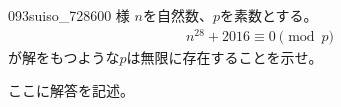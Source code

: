 \begin{prob}{093}{}{suiso\_728600 様}
 $n$を自然数、$p$を素数とする。
 \begin{align*}
  n^{28}+2016 \equiv 0 \pmod p
 \end{align*}
 が解をもつような$p$は無限に存在することを示せ。
\end{prob}
ここに解答を記述。